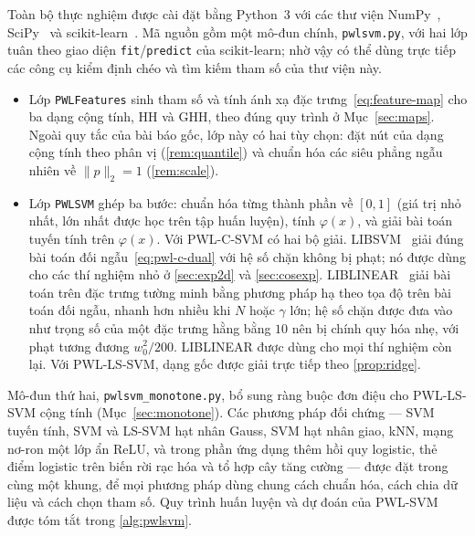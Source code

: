 Toàn bộ thực nghiệm được cài đặt bằng Python~3 với các thư viện NumPy~\cite{harris2020}, SciPy~\cite{virtanen2020} và scikit-learn~\cite{pedregosa2011}. Mã nguồn gồm một mô-đun chính, \texttt{pwlsvm.py}, với hai lớp tuân theo giao diện \texttt{fit}/\texttt{predict} của scikit-learn; nhờ vậy có thể dùng trực tiếp các công cụ kiểm định chéo và tìm kiếm tham số của thư viện này.
\begin{itemize}
\item Lớp \texttt{PWLFeatures} sinh tham số và tính ánh xạ đặc trưng~\eqref{eq:feature-map} cho ba dạng cộng tính, HH và GHH, theo đúng quy trình ở Mục~\ref{sec:maps}. Ngoài quy tắc của bài báo gốc, lớp này có hai tùy chọn: đặt nút của dạng cộng tính theo phân vị (\cref{rem:quantile}) và chuẩn hóa các siêu phẳng ngẫu nhiên về $\|p\|_2=1$ (\cref{rem:scale}).
\item Lớp \texttt{PWLSVM} ghép ba bước: chuẩn hóa từng thành phần về $[0,1]$ (giá trị nhỏ nhất, lớn nhất được học trên tập huấn luyện), tính $\varphi(x)$, và giải bài toán tuyến tính trên $\varphi(x)$. Với PWL-C-SVM có hai bộ giải. LIBSVM~\cite{chang2011} giải đúng bài toán đối ngẫu~\eqref{eq:pwl-c-dual} với hệ số chặn không bị phạt; nó được dùng cho các thí nghiệm nhỏ ở \cref{sec:exp2d} và \cref{sec:cosexp}. LIBLINEAR~\cite{fan2008} giải bài toán trên đặc trưng tường minh bằng phương pháp hạ theo tọa độ trên bài toán đối ngẫu, nhanh hơn nhiều khi $N$ hoặc $\gamma$ lớn; hệ số chặn được đưa vào như trọng số của một đặc trưng hằng bằng $10$ nên bị chính quy hóa nhẹ, với phạt tương đương $w_0^2/200$. LIBLINEAR được dùng cho mọi thí nghiệm còn lại. Với PWL-LS-SVM, dạng gốc được giải trực tiếp theo \cref{prop:ridge}.
\end{itemize}
Mô-đun thứ hai, \texttt{pwlsvm\_monotone.py}, bổ sung ràng buộc đơn điệu cho PWL-LS-SVM cộng tính (Mục~\ref{sec:monotone}). Các phương pháp đối chứng --- SVM tuyến tính, SVM và LS-SVM hạt nhân Gauss, SVM hạt nhân giao, kNN, mạng nơ-ron một lớp ẩn ReLU, và trong phần ứng dụng thêm hồi quy logistic, thẻ điểm logistic trên biến rời rạc hóa và tổ hợp cây tăng cường --- được đặt trong cùng một khung, để mọi phương pháp dùng chung cách chuẩn hóa, cách chia dữ liệu và cách chọn tham số. Quy trình huấn luyện và dự đoán của PWL-SVM được tóm tắt trong \cref{alg:pwlsvm}.

